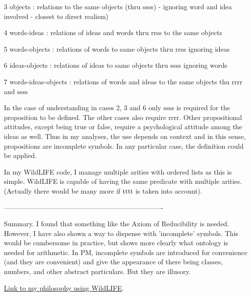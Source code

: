 \documentclass[12pt]{article}
\begin{document}
3 objects : relations to the same objects (thru ssss) - ignoring word and idea involved - closest to direct realism)

4 words-ideas : relations of ideas and words thru rrss to the same objects

5 words-objects : relations of words to same objects thru rrss ignoring ideas

6 ideas-objects : relations of ideas to same objects thru ssss ignoring words

7 words-ideas-objects : relations of words and ideas to the same objects thu rrrr and ssss

In the case of understanding in cases 2, 3 and 6 only ssss is required for the proposition to be defined. The other cases also require rrrr. Other propositional attitudes, except being true or false, require a psychological attitude among the ideas as well. Thus in my analyses, the use depends on context and in this sense, propositions are incomplete symbols. In any particular case, the definition could be applied.

In my WildLIFE code, I manage multiple arities with ordered lists as this is simple. WildLIFE is capable of having the same predicate with multiple arities. 
(Actually there would be many more if tttt is taken into account).

----------------------------------------------------------------------

Summary. I found that something like the Axiom of Reducibility is needed. However, I have also shown a way to dispense with 'incomplete' symbols. This would be cumbersome in practice, but shows more clearly what ontology is needed for arithmetic. In PM, incomplete symbols are introduced for convenience (and they are convenient) and give the appearance of there being classes, numbers, and other abstract particulars. But they are illusory.

\href{https://dennisdarland.com/darland_philosophy/HTML/darland_philosophy.html}{Link to my philosophy using WildLIFE}.
\end{document}
